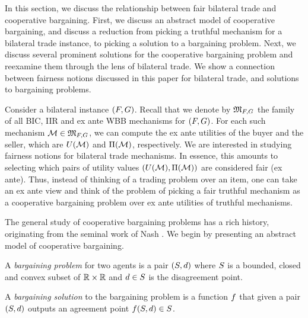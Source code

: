 In this section, we discuss the relationship between fair bilateral trade and cooperative bargaining. First, we discuss an abstract model of cooperative bargaining, and discuss a reduction from picking a truthful mechanism for a bilateral trade instance, to picking a solution to a bargaining problem. Next, we discuss several prominent solutions for the cooperative bargaining problem and reexamine them through the lens of bilateral trade. We show a connection between fairness notions discussed in this paper for bilateral trade, and 
solutions to bargaining problems.

Consider a bilateral instance $(F,G)$. Recall that we denote by $\mathfrak{M}_{F,G}$ the family of all BIC, IIR  and ex ante WBB mechanisms for $(F,G)$. For each such mechanism $\mathcal{M}\in \mathfrak{M}_{F,G}$, we can compute the ex ante utilities of the buyer and the seller, which are  $U(\mathcal{M})$ and $ \Pi(\mathcal{M})$, respectively. We are interested in studying fairness notions for bilateral trade mechanisms. In essence, this amounts to selecting which pairs of utility values $(U(\mathcal{M}), \Pi(\mathcal{M}))$ are considered fair (ex ante). Thus, instead of thinking of a trading problem over an item, one can  take an ex ante view and think of the problem of picking a fair truthful mechanism as a cooperative bargaining problem over ex ante utilities of truthful mechanisms.

The general study of cooperative bargaining problems has a rich history, originating from the seminal work of Nash \cite{N-50}. We begin by presenting an abstract model of cooperative bargaining.

\begin{definition} 
    A \emph{bargaining problem} for two agents is a pair $(S,d)$ where $S$ is a bounded, closed and convex subset of $\mathbb{R}\times\mathbb{R}$ and $d\in S$ is the disagreement point.

    A \emph{bargaining solution} to the bargaining problem is a function $f$ that given a pair $(S,d)$ outputs an agreement point $f(S,d) \in S$.
\end{definition}

